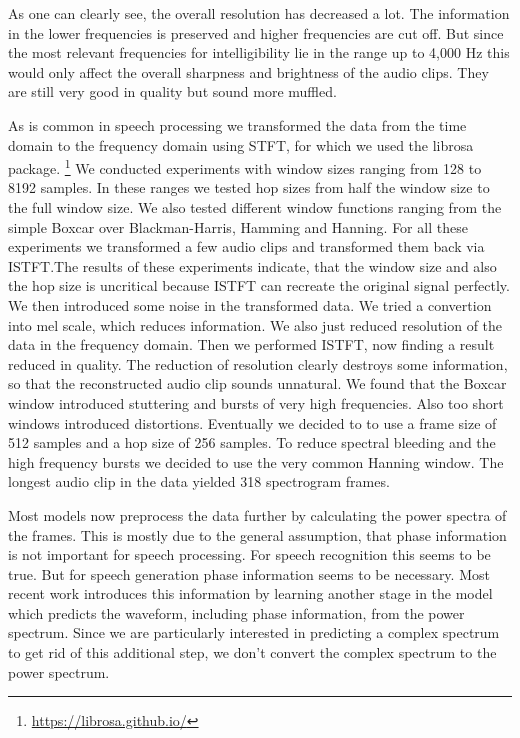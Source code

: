 \documentclass[11pt]{article}
\begin{document}
As one can clearly see, the overall resolution has decreased a lot. The information in the lower frequencies is preserved and higher frequencies are cut off. But since the most relevant frequencies for intelligibility lie in the range up to 4,000 Hz this would only affect the overall sharpness and brightness of the audio clips. They are still very good in quality but sound more muffled.

As is common in speech processing we transformed the data from the time domain to the frequency domain using STFT, for which we used the librosa package.%
\footnote{\url{https://librosa.github.io/}}
We conducted experiments with window sizes ranging from 128 to 8192 samples. In these ranges we tested hop sizes from half the window size to the full window size. We also tested different window functions ranging from the simple Boxcar over Blackman-Harris, Hamming and Hanning. For all these experiments we transformed a few audio clips and transformed them back via ISTFT.\@ The results of these experiments indicate, that the window size and also the hop size is uncritical because ISTFT can recreate the original signal perfectly. We then introduced some noise in the transformed data. We tried a convertion into mel scale, which reduces information. We also just reduced resolution of the data in the frequency domain. Then we performed ISTFT, now finding a result reduced in quality. The reduction of resolution clearly destroys some information, so that the reconstructed audio clip sounds unnatural. We found that the Boxcar window introduced stuttering and bursts of very high frequencies. Also too short windows introduced distortions.
Eventually we decided to to use a frame size of 512 samples and a hop size of 256 samples. To reduce spectral bleeding and the high frequency bursts we decided to use the very common Hanning window.
The longest audio clip in the data yielded 318 spectrogram frames.

Most models now preprocess the data further by calculating the power spectra of the frames. This is mostly due to the general assumption, that phase information is not important for speech processing. For speech recognition this seems to be true. But for speech generation phase information seems to be necessary. Most recent work introduces this information by learning another stage in the model which predicts the waveform, including phase information, from the power spectrum.
Since we are particularly interested in predicting a complex spectrum to get rid of this additional step, we don't convert the complex spectrum to the power spectrum.
\end{document}
